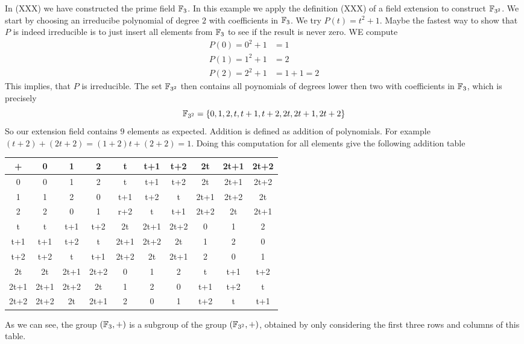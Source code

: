\begin{example}In (XXX) we have constructed the prime field $\mathbb{F}_3$. In this example we apply the definition (XXX) of a field extension to construct $\mathbb{F}_{3^2}$. We start by choosing an irreducibe polynomial of degree $2$ with coefficients in $\mathbb{F}_3$. We try 
$P(t)=t^2+1$. Maybe the fastest way to show that $P$ is indeed irreducible is to just insert all elements from $\mathbb{F}_3$ to see if the result is never zero. WE compute
\begin{align*}
P(0) = 0^2+1 &= 1\\
P(1) = 1^2+1 &= 2\\
P(2) = 2^2+1 &=  1+1  = 2
\end{align*}
This implies, that $P$ is irreducible. The set $\mathbb{F}_{3^2}$ then contains all poynomials of degrees lower then two with coefficients in $\mathbb{F}_3$, which is precisely
$$
\mathbb{F}_{3^2}=\{0,1,2,t,t+1,t+2,2t,2t+1,2t+2\}
$$
So our extension field contains $9$ elements as expected. Addition is  defined as addition of polynomials. For example $(t+2) + (2t+2)= (1+2)t +(2+2)= 1$. Doing this computation for all elements give the following addition table
\begin{center}
  \begin{tabular}{c | c c c c c c c c c}
    + & 0    & 1    & 2    & t    & t+1  & t+2  & 2t   & 2t+1 & 2t+2 \\\hline
    0 & 0    & 1    & 2    & t    & t+1  & t+2  & 2t   & 2t+1 & 2t+2 \\
    1 & 1    & 2    & 0    & t+1  & t+2  & t    & 2t+1 & 2t+2 & 2t   \\
    2 & 2    & 0    & 1    & r+2  & t    & t+1  & 2t+2 & 2t   & 2t+1 \\
    t & t    & t+1  & t+2  & 2t   & 2t+1 & 2t+2 & 0    & 1    & 2    \\
  t+1 & t+1  & t+2  & t    & 2t+1 & 2t+2 & 2t   & 1    & 2    & 0    \\
  t+2 & t+2  & t    & t+1  & 2t+2 & 2t   & 2t+1 & 2    & 0    & 1    \\
   2t & 2t   & 2t+1 & 2t+2 & 0    & 1    & 2    & t    & t+1  & t+2  \\
 2t+1 & 2t+1 & 2t+2 & 2t   & 1    & 2    & 0    & t+1  & t+2  & t    \\
 2t+2 & 2t+2 & 2t   & 2t+1 & 2    & 0    & 1    & t+2  & t    & t+1
  \end{tabular}
\end{center}
As we can see, the group $(\mathbb{F}_3,+)$ is a subgroup of the group $(\mathbb{F}_{3^2},+)$, obtained by only considering the first three rows and columns of this table.


\end{example}
